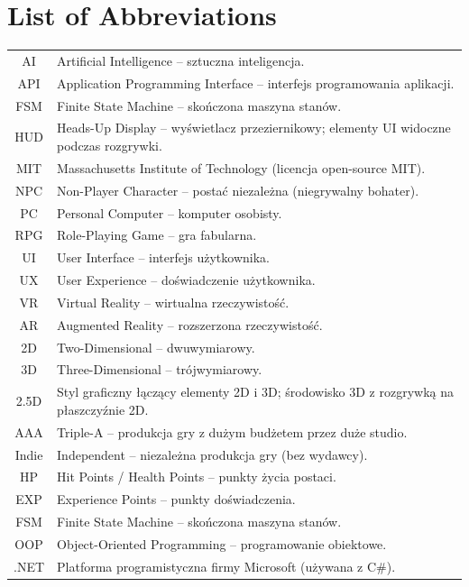 \section*{List of Abbreviations}

\begin{longtable}{cp{}}

AI    & Artificial Intelligence – sztuczna inteligencja. \\
API   & Application Programming Interface – interfejs programowania aplikacji. \\
FSM   & Finite State Machine – skończona maszyna stanów. \\
HUD   & Heads-Up Display – wyświetlacz przeziernikowy; elementy UI widoczne podczas rozgrywki. \\
MIT   & Massachusetts Institute of Technology (licencja open-source MIT). \\
NPC   & Non-Player Character – postać niezależna (niegrywalny bohater). \\
PC    & Personal Computer – komputer osobisty. \\
RPG   & Role-Playing Game – gra fabularna. \\
UI    & User Interface – interfejs użytkownika. \\
UX    & User Experience – doświadczenie użytkownika. \\
VR    & Virtual Reality – wirtualna rzeczywistość. \\
AR    & Augmented Reality – rozszerzona rzeczywistość. \\
2D    & Two-Dimensional – dwuwymiarowy. \\
3D    & Three-Dimensional – trójwymiarowy. \\
2.5D  & Styl graficzny łączący elementy 2D i 3D; środowisko 3D z rozgrywką na płaszczyźnie 2D. \\
AAA   & Triple-A – produkcja gry z dużym budżetem przez duże studio. \\
Indie & Independent – niezależna produkcja gry (bez wydawcy). \\
HP    & Hit Points / Health Points – punkty życia postaci. \\
EXP   & Experience Points – punkty doświadczenia. \\
FSM   & Finite State Machine – skończona maszyna stanów. \\
OOP   & Object-Oriented Programming – programowanie obiektowe. \\
.NET  & Platforma programistyczna firmy Microsoft (używana z C\#). \\

\end{longtable}
